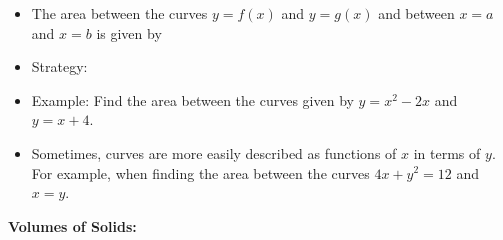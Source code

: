 \documentclass[12pt]{report}
\newcommand{\ds}{\displaystyle}
\begin{document}
\begin{itemize}

\item The area between the curves $y = f(x)$ and $y = g(x)$ and between $x = a$ and $x=b$ is given by %

\bigskip

\item Strategy: 


\bigskip\bigskip\bigskip

\item Example: Find the area between the curves given by $y = x^2 - 2x$ and $y = x+4$.

\newpage

\item Sometimes, curves are more easily described as functions of $x$ in terms of $y$. For example, when finding the area between the curves $4x+y^2 = 12$ and $x = y$. %

\vspace{2in}



\end{itemize}











\noindent\textbf{Volumes of Solids:}
\end{document}
